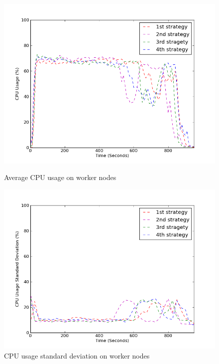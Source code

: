 \documentclass[11pt,a4paper,twoside]{report}
\begin{document}
\begin{figure}[ht]
\begin{minipage}[b]{0.47\linewidth}
\centering
\includegraphics[scale=0.36]{avg-cpu-w}
\caption{Average CPU usage on worker nodes}
\label{fig:AvgCpuW}
\end{minipage}
\hspace{0.2cm}
\begin{minipage}[b]{0.5\linewidth}
\centering
\includegraphics[scale=0.36]{sd-cpu-w}
\caption{CPU usage standard deviation on worker nodes}
\label{fig:SdCpuW}
\end{minipage}
\end{figure}
\end{document}
